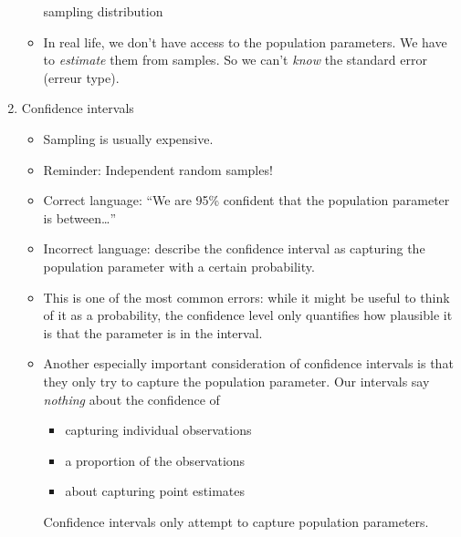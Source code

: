 \begin{enumerate}
\begin{itemize}
      sampling distribution
    \item In real life, we don't have access to the population
      parameters.  We have to \textit{estimate} them from samples.  So
      we can't \textit{know} the standard error (erreur type).
  \end{itemize}
\item{Confidence intervals}
  \begin{itemize}
  \item Sampling is usually expensive.
  \item Reminder:  Independent random samples!
  \item
    Correct language: ``We are 95\% confident that the population
    parameter is between\dots''
  \item
    Incorrect language: describe the confidence interval as capturing
    the population parameter with a certain probability.
  \item
    This is one of the most common errors: while it might be useful to
    think of it as a probability, the confidence level only quantifies
    how plausible it is that the parameter is in the interval.
  \item
    Another especially important consideration of confidence intervals
    is that they only try to capture the population parameter. Our
    intervals say \textit{nothing} about the confidence of
    \begin{itemize}
    \item capturing individual observations
    \item a proportion of the observations
    \item about capturing point estimates
    \end{itemize}
    Confidence intervals only attempt to capture population
    parameters.
  \end{itemize}
\end{enumerate}


